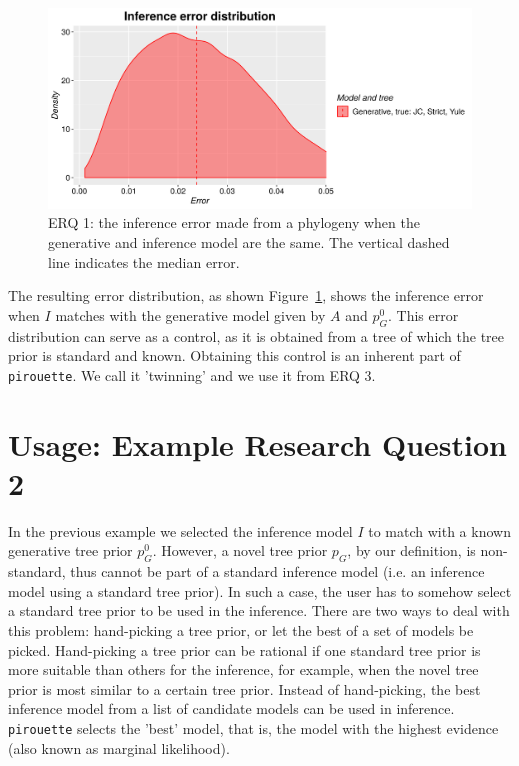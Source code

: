 \begin{figure}[H]
  \includegraphics[width=\textwidth]{example_1/errors.png}
  \caption{
    ERQ 1: the inference error made from a phylogeny 
    when the generative and inference model are the same.
    The vertical dashed line indicates the median error.
  }
  \label{fig:example_1}
\end{figure}

The resulting error distribution, as shown Figure~\ref{fig:example_1},
shows the inference error 
when $\mathit{I}$ matches with the generative model given 
by $\mathit{A}$ and $\mathit{p_{G}^0}$.
This error distribution can serve as a control,
as it is obtained from a tree of which the tree prior is standard and known.
Obtaining this control is an inherent part of \verb;pirouette;. 
We call it 'twinning' and we use it from ERQ 3.

\section{Usage: Example Research Question 2}

In the previous example we selected the inference model $\mathit{I}$ to match 
with a known generative tree prior $\mathit{p_{G}^0}$.
However, a novel tree prior $\mathit{p_{G}}$, by our definition, is non-standard, 
thus cannot be part of a standard inference 
model (i.e. an inference model using a standard tree prior).
In such a case, the user has to somehow select 
a standard tree prior to be 
used in the inference.
There are two ways to deal with this problem: hand-picking a tree
prior, or let the best of a set of models be picked. 
Hand-picking a tree prior can be rational if one standard tree prior 
is more suitable than others for the inference, for example, when
the novel tree prior is most similar to a certain tree prior.
Instead of hand-picking, the best inference model from a list of candidate 
models can be used in inference.
\verb;pirouette; selects the 'best' model, that is, 
the model with the highest evidence (also known as marginal likelihood). 

